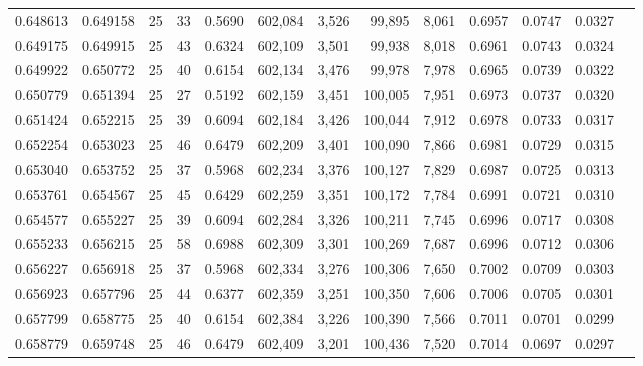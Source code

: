 \begin{tabular}{rrrrrrrrrrrrr}
0.648613 & 0.649158 &    25 &  33 &                                     0.5690 & 602,084 &   3,526 &  99,895 &   8,061 & 0.6957 & 0.0747 & 0.0327 \\
0.649175 & 0.649915 &    25 &  43 &                                     0.6324 & 602,109 &   3,501 &  99,938 &   8,018 & 0.6961 & 0.0743 & 0.0324 \\
0.649922 & 0.650772 &    25 &  40 &                                     0.6154 & 602,134 &   3,476 &  99,978 &   7,978 & 0.6965 & 0.0739 & 0.0322 \\
0.650779 & 0.651394 &    25 &  27 &                                     0.5192 & 602,159 &   3,451 & 100,005 &   7,951 & 0.6973 & 0.0737 & 0.0320 \\
0.651424 & 0.652215 &    25 &  39 &                                     0.6094 & 602,184 &   3,426 & 100,044 &   7,912 & 0.6978 & 0.0733 & 0.0317 \\
0.652254 & 0.653023 &    25 &  46 &                                     0.6479 & 602,209 &   3,401 & 100,090 &   7,866 & 0.6981 & 0.0729 & 0.0315 \\
0.653040 & 0.653752 &    25 &  37 &                                     0.5968 & 602,234 &   3,376 & 100,127 &   7,829 & 0.6987 & 0.0725 & 0.0313 \\
0.653761 & 0.654567 &    25 &  45 &                                     0.6429 & 602,259 &   3,351 & 100,172 &   7,784 & 0.6991 & 0.0721 & 0.0310 \\
0.654577 & 0.655227 &    25 &  39 &                                     0.6094 & 602,284 &   3,326 & 100,211 &   7,745 & 0.6996 & 0.0717 & 0.0308 \\
0.655233 & 0.656215 &    25 &  58 &                                     0.6988 & 602,309 &   3,301 & 100,269 &   7,687 & 0.6996 & 0.0712 & 0.0306 \\
0.656227 & 0.656918 &    25 &  37 &                                     0.5968 & 602,334 &   3,276 & 100,306 &   7,650 & 0.7002 & 0.0709 & 0.0303 \\
0.656923 & 0.657796 &    25 &  44 &                                     0.6377 & 602,359 &   3,251 & 100,350 &   7,606 & 0.7006 & 0.0705 & 0.0301 \\
0.657799 & 0.658775 &    25 &  40 &                                     0.6154 & 602,384 &   3,226 & 100,390 &   7,566 & 0.7011 & 0.0701 & 0.0299 \\
0.658779 & 0.659748 &    25 &  46 &                                     0.6479 & 602,409 &   3,201 & 100,436 &   7,520 & 0.7014 & 0.0697 & 0.0297 \\

\end{tabular}
